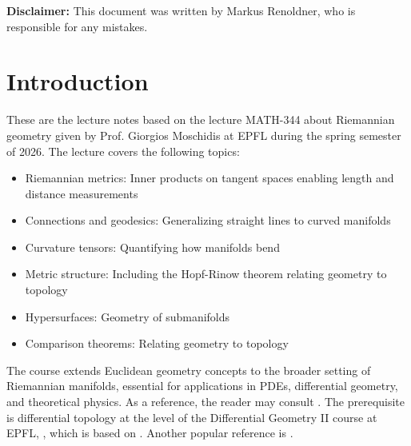 


\begin{center}
    \textbf{Disclaimer:} 
    This document was written by Markus Renoldner, who is responsible for any mistakes.
\end{center}

\vspace{0.5cm}

\tableofcontents

\newpage

\newpage
\section{Introduction}

These are the lecture notes based on the lecture MATH-344 about Riemannian geometry given by Prof. Giorgios Moschidis at EPFL during the spring semester of 2026. The lecture covers the following topics:
\begin{itemize}
    \item Riemannian metrics: Inner products on tangent spaces enabling length and distance measurements
    \item Connections and geodesics: Generalizing straight lines to curved manifolds
    \item Curvature tensors: Quantifying how manifolds bend
    \item Metric structure: Including the Hopf-Rinow theorem relating geometry to topology
    \item Hypersurfaces: Geometry of submanifolds
    \item Comparison theorems: Relating geometry to topology
\end{itemize}

The course extends Euclidean geometry concepts to the broader setting of Riemannian manifolds, essential for applications in PDEs, differential geometry, and theoretical physics. As a reference, the reader may consult \cite{doCarmo1992RiemannianGeometry}. The prerequisite is differential topology at the level of the Differential Geometry II course at EPFL, \cite{tsakanikas2024dg2}, which is based on \cite{lee2003smooth}. Another popular reference is \cite{lee2018riemannian}.











